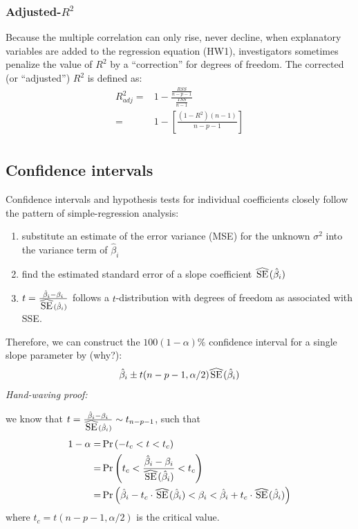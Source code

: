 \subsubsection*{Adjusted-$R^2$}
Because the multiple correlation can only rise, never decline, when explanatory variables are added to the regression equation (HW1), investigators sometimes penalize the value of $R^2$ by a ``correction'' for degrees of freedom.
The corrected (or ``adjusted'') $R^2$ is defined as:
$$
\begin{aligned}
R^2_{adj} =& 1 - \frac{\frac{RSS}{n - p - 1}}{\frac{TSS}{n - 1}}\\
=& 1 - \left[ \frac{(1 - R^2)(n - 1)}{n - p - 1} \right]\\
\end{aligned}
$$

\newpage
\subsection*{Confidence intervals}
Confidence intervals and hypothesis tests for individual coefficients closely follow the pattern of simple-regression analysis:
\begin{enumerate}
  \item substitute an estimate of the error variance (MSE) for the unknown $\sigma^2$ into the variance term of $\hat{\beta}_i$
  \item find the estimated standard error of a slope coefficient $\reallywidehat{SE}(\hat{\beta}_i)$
  \item $t = \frac{\hat{\beta}_i - \beta_i}{\reallywidehat{SE}(\hat{\beta}_i)}$ follows a $t$-distribution with degrees of freedom as associated with SSE.
\end{enumerate}
Therefore, we can construct the $100(1 - \alpha)\%$ confidence interval for a single slope parameter by (why?):
$$
\hat{\beta}_i \pm t(n - p - 1, \alpha/2) \reallywidehat{SE}(\hat{\beta}_i)
$$
{\it Hand-waving proof: }\\
\begin{pf}
we know that $t = \frac{\hat{\beta}_i - \beta_i}{\reallywidehat{SE}(\hat{\beta}_i)} \sim t_{n - p - 1}$, such that
$$
\begin{aligned}
1 - \alpha =& \Pr\left( -t_c < t < t_c \right)\\
=& \Pr \left( t_c < \frac{\hat{\beta}_i - \beta_i}{\reallywidehat{SE}(\hat{\beta}_i)} < t_c \right)\\
=& \Pr \left( \hat{\beta}_i - t_c \cdot \reallywidehat{SE}(\hat{\beta}_i) < \beta_i < \hat{\beta}_i + t_c \cdot \reallywidehat{SE}(\hat{\beta}_i)  \right)\\
\end{aligned}
$$
where $t_c = t(n - p - 1, \alpha/2)$ is the critical value.  
\end{pf}

